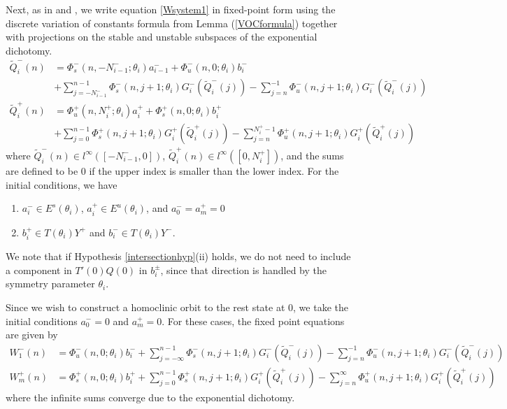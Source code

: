 \documentclass[12pt]{article}
\begin{document}
Next, as in \cite{Sandstede1997} and \cite{Knobloch2000}, we write equation \eqref{Wsystem1} in fixed-point form using the discrete variation of constants formula from Lemma (\ref{VOCformula}) together with projections on the stable and unstable subspaces of the exponential dichotomy.
\begin{equation}\label{FPeqs1}
\begin{aligned}
\tilde{Q}_i^-(n) &= 
\Phi_s^-(n, -N_{i-1}^-; \theta_i) a_{i-1}^- + \Phi_u^-(n, 0; \theta_i) b_i^-  \\
&+ \sum_{j = -N_{i-1}^-}^{n-1} \Phi_s^-(n, j+1; \theta_i) G_i^-(\tilde{Q}_i^-(j)) - \sum_{j = n}^{-1} \Phi_u^-(n, j+1; \theta_i) G_i^-(\tilde{Q}_i^-(j)) \\
\tilde{Q}_i^+(n) &= \Phi_u^+(n, N_i^+; \theta_i) a_i^+ + \Phi_s^+(n, 0; \theta_i) b_i^+ \\
&+ \sum_{j = 0}^{n-1} \Phi_s^+(n, j+1; \theta_i) G_i^+(\tilde{Q}_i^+(j)) 
- \sum_{j = n}^{N_i^+-1} \Phi_u^+(n, j+1; \theta_i) G_i^+(\tilde{Q}_i^+(j))
\end{aligned}
\end{equation}
where $\tilde{Q}_i^-(n) \in l^\infty([-N_{i-1}^-, 0])$, $\tilde{Q}_i^+(n) \in l^\infty([0, N_i^+])$, and the sums are defined to be $0$ if the upper index is smaller than the lower index. For the initial conditions, we have
\begin{enumerate}
\item $a_i^- \in E^s(\theta_i)$, $a_i^+ \in E^u(\theta_i)$, and $a_0^- = a_m^+ = 0$
\item $b_i^+ \in T(\theta_i) Y^+$ and $b_i^- \in T(\theta_i) Y^-$.
\end{enumerate}
We note that if Hypothesis \ref{intersectionhyp}(ii) holds, we do not need to include a component in $T'(0) Q(0)$ in $b_i^\pm$, since that direction is handled by the symmetry parameter $\theta_i$.

Since we wish to construct a homoclinic orbit to the rest state at 0, we take the initial conditions $a_0^- = 0$ and $a_m^+ = 0$. For these cases, the fixed point equations are given by
\begin{align*}
W_1^-(n) &= \Phi_u^-(n, 0; \theta_i) b_i^- 
+ \sum_{j = -\infty}^{n-1} \Phi_s^-(n, j+1; \theta_i) G_i^-(\tilde{Q}_i^-(j)) - \sum_{j = n}^{-1} \Phi_u^-(n, j+1; \theta_i) G_i^-(\tilde{Q}_i^-(j)) \\
W_m^+(n) &= \Phi_s^+(n, 0; \theta_i) b_i^+ 
+ \sum_{j = 0}^{n-1} \Phi_s^+(n, j+1; \theta_i) G_i^+(\tilde{Q}_i^+(j)) 
- \sum_{j = n}^\infty \Phi_u^+(n, j+1; \theta_i) G_i^+(\tilde{Q}_i^+(j))
\end{align*}
where the infinite sums converge due to the exponential dichotomy. 
\end{document}
